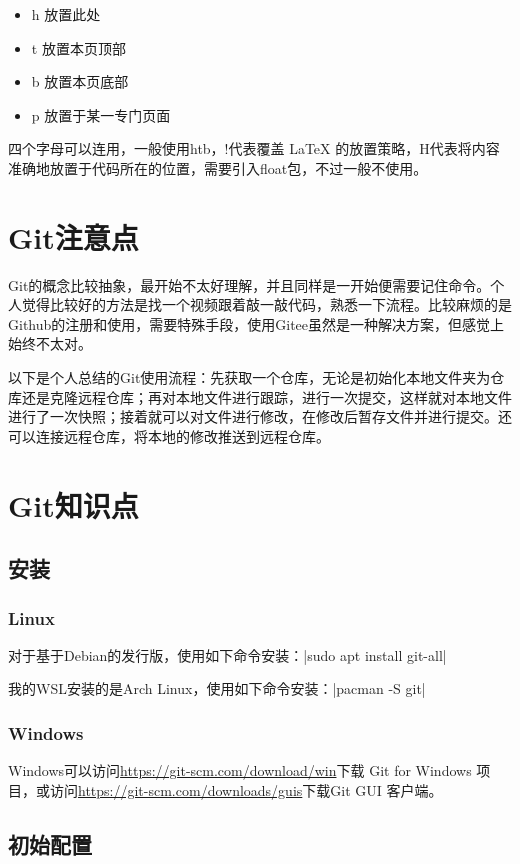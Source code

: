\documentclass[fontset=ubuntu]{ctexart}
\begin{document}
\begin{itemize}
    \item h 放置此处
    \item t 放置本页顶部
    \item b 放置本页底部
    \item p 放置于某一专门页面
\end{itemize}

四个字母可以连用，一般使用htb，!代表覆盖 \LaTeX{} 的放置策略，H代表将内容准确地放置于代码所在的位置，需要引入float包，不过一般不使用。

\section{Git注意点}
Git的概念比较抽象，最开始不太好理解，并且同样是一开始便需要记住命令。个人觉得比较好的方法是找一个视频跟着敲一敲代码，熟悉一下流程。比较麻烦的是Github的注册和使用，需要特殊手段，使用Gitee虽然是一种解决方案，但感觉上始终不太对。

以下是个人总结的Git使用流程：先获取一个仓库，无论是初始化本地文件夹为仓库还是克隆远程仓库；再对本地文件进行跟踪，进行一次提交，这样就对本地文件进行了一次快照；接着就可以对文件进行修改，在修改后暂存文件并进行提交。还可以连接远程仓库，将本地的修改推送到远程仓库。

\section{Git知识点}

\subsection{安装}
\subsubsection{Linux}
对于基于Debian的发行版，使用如下命令安装：|sudo apt install git-all|

我的WSL安装的是Arch Linux，使用如下命令安装：|pacman -S git|

\subsubsection{Windows}
Windows可以访问\url{https://git-scm.com/download/win}下载 Git for Windows 项目，或访问\url{https://git-scm.com/downloads/guis}下载Git GUI 客户端。

\subsection{初始配置}
\end{document}
